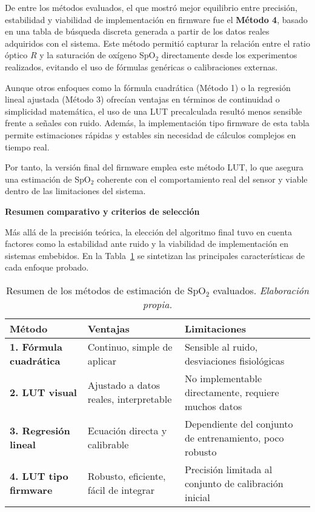 De entre los métodos evaluados, el que mostró mejor equilibrio entre precisión, estabilidad y viabilidad de implementación en firmware fue el \textbf{Método 4}, basado en una tabla de búsqueda discreta generada a partir de los datos reales adquiridos con el sistema. Este método permitió capturar la relación entre el ratio óptico \(R\) y la saturación de oxígeno SpO$_2$ directamente desde los experimentos realizados, evitando el uso de fórmulas genéricas o calibraciones externas.

Aunque otros enfoques como la fórmula cuadrática (Método 1) o la regresión lineal ajustada (Método 3) ofrecían ventajas en términos de continuidad o simplicidad matemática, el uso de una LUT precalculada resultó menos sensible frente a señales con ruido. Además, la implementación tipo firmware de esta tabla permite estimaciones rápidas y estables sin necesidad de cálculos complejos en tiempo real.

Por tanto, la versión final del firmware emplea este método LUT, lo que asegura una estimación de SpO$_2$ coherente con el comportamiento real del sensor y viable dentro de las limitaciones del sistema.

\vspace{0.4cm}
\noindent
\textbf{Resumen comparativo y criterios de selección}

Más allá de la precisión teórica, la elección del algoritmo final tuvo en cuenta factores como la estabilidad ante ruido y la viabilidad de implementación en sistemas embebidos. En la Tabla~\ref{tab:resumen_spo2} se sintetizan las principales características de cada enfoque probado.

\begin{table}[H]
\centering
\footnotesize
\renewcommand{\arraystretch}{1.2}
\begin{tabular}{|p{2.6cm}|p{4.4cm}|p{4.4cm}|}
\hline
\textbf{Método} & \textbf{Ventajas} & \textbf{Limitaciones} \\
\hline
\textbf{1. Fórmula cuadrática} & Continuo, simple de aplicar & Sensible al ruido, desviaciones fisiológicas \\
\hline
\textbf{2. LUT visual} & Ajustado a datos reales, interpretable & No implementable directamente, requiere muchos datos \\
\hline
\textbf{3. Regresión lineal} & Ecuación directa y calibrable & Dependiente del conjunto de entrenamiento, poco robusto \\
\hline
\rowcolor{gray!20}
\textbf{4. LUT tipo firmware} & Robusto, eficiente, fácil de integrar & Precisión limitada al conjunto de calibración inicial \\
\hline
\end{tabular}
\caption{Resumen de los métodos de estimación de SpO$_2$ evaluados. \textit{Elaboración propia.}}
\label{tab:resumen_spo2}
\end{table}



